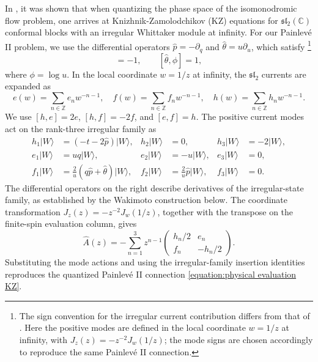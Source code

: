 \documentclass[a4paper,11pt]{article}
\numberwithin{equation}{section}
\begin{document}
In \cite{BanerjeeHaghighatLatifi2026}, it was shown that when quantizing the phase space of the isomonodromic flow problem, one arrives at Knizhnik-Zamolodchikov (KZ) equations for $\mathfrak{sl}_2(\mathbb{C})$ conformal blocks with an irregular Whittaker module at infinity. For our Painlev\'e II problem, we use the differential operators
$\hat p=-\partial_q$ and $\hat\theta=u\partial_u$, which satisfy
\footnote{The sign convention for the irregular current contribution
differs from that of \cite{BanerjeeHaghighatLatifi2026}. Here the
positive modes are defined in the local coordinate $w=1/z$ at infinity,
with $J_z(z)=-z^{-2}J_w(1/z)$; the mode signs are chosen accordingly
to reproduce the same Painlev\'e II connection.}
\begin{equation}
    [\hat p,q]=-1,\qquad [\hat\theta,\phi]=1,
\end{equation}
where $\phi=\log u$. In the local coordinate $w=1/z$ at infinity,
the $\mathfrak{sl}_2$ currents are expanded as
\begin{equation}
    e(w) = \sum_{n \in \mathbb{Z}} e_n w^{-n-1}, \quad f(w) = \sum_{n \in \mathbb{Z}} f_n w^{-n-1}, \quad
    h(w) = \sum_{n \in \mathbb{Z}} h_n w^{-n-1}.
\end{equation}
We use $[h,e]=2e$, $[h,f]=-2f$, and $[e,f]=h$.
The positive current modes act on the rank-three irregular family as
\begin{align}
    h_1|W\rangle&=(-t-2\hat p)|W\rangle,
    &h_2|W\rangle&=0,
    &h_3|W\rangle&=-2|W\rangle,\\
    e_1|W\rangle&=uq|W\rangle,
    &e_2|W\rangle&=-u|W\rangle,
    &e_3|W\rangle&=0,\\
    f_1|W\rangle&=\frac{2}{u}(q\hat p+\hat\theta)|W\rangle,
    &f_2|W\rangle&=\frac{2}{u}\hat p|W\rangle,
    &f_3|W\rangle&=0.
\end{align}
The differential operators on the right describe derivatives of the
irregular-state family, as established by the Wakimoto construction
below. The coordinate transformation $J_z(z)=-z^{-2}J_w(1/z)$,
together with the transpose on the finite-spin evaluation column, gives
\begin{equation*}
    \widehat A(z)
    =-\sum_{n=1}^{3}z^{n-1}
    \begin{pmatrix}
        h_n/2&e_n\\
        f_n&-h_n/2
    \end{pmatrix}.
\end{equation*}
Substituting the mode actions and using the irregular-family insertion
identities reproduces the quantized Painlev\'e II connection
\eqref{equation:physical evaluation KZ}.
\end{document}
